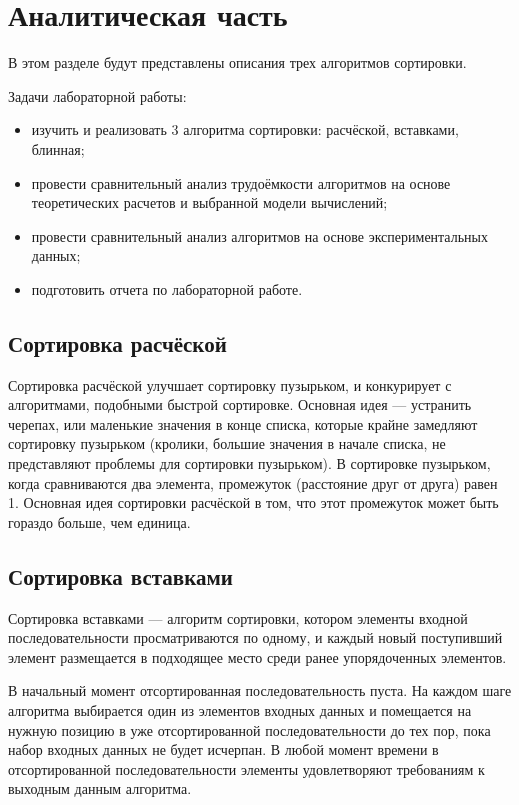\chapter{Аналитическая часть}

В этом разделе будут представлены описания трех алгоритмов сортировки.

Задачи лабораторной работы:
\begin{itemize}
	\item изучить и реализовать 3 алгоритма сортировки: расчёской, вставками, блинная;
	\item провести сравнительный анализ трудоёмкости алгоритмов на основе теоретических расчетов и выбранной модели вычислений;
	\item провести сравнительный анализ алгоритмов на основе экспериментальных данных;
    \item подготовить отчета по лабораторной работе.
\end{itemize}

\section{Сортировка расчёской}
Сортировка расчёской улучшает сортировку пузырьком, и конкурирует с алгоритмами, подобными быстрой сортировке.
Основная идея — устранить черепах, или маленькие значения в конце списка, которые крайне замедляют сортировку пузырьком (кролики, большие значения в начале списка, не представляют проблемы для сортировки пузырьком).
В сортировке пузырьком, когда сравниваются два элемента, промежуток (расстояние друг от друга) равен 1.
Основная идея сортировки расчёской в том, что этот промежуток может быть гораздо больше, чем единица.

\section{Сортировка вставками}
Сортировка вставками — алгоритм сортировки, котором элементы входной последовательности просматриваются по одному, и каждый новый поступивший элемент размещается в подходящее место среди ранее упорядоченных элементов.

В начальный момент отсортированная последовательность пуста.
На каждом шаге алгоритма выбирается один из элементов входных данных и помещается на нужную позицию в уже отсортированной последовательности до тех пор, пока набор входных данных не будет исчерпан.
В любой момент времени в отсортированной последовательности элементы удовлетворяют требованиям к выходным данным алгоритма.

